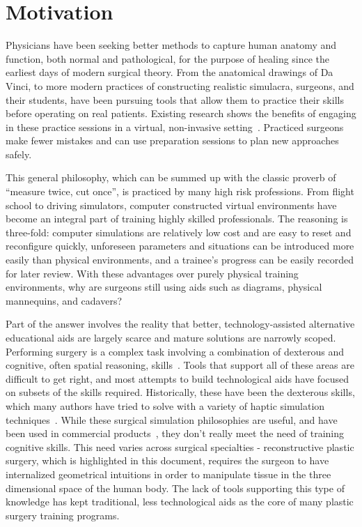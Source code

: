 \section{Motivation}

Physicians have been seeking better methods to capture human anatomy
and function, both normal and pathological, for the purpose of healing
since the earliest days of modern surgical theory. From the anatomical
drawings of Da Vinci, to more modern practices of constructing
realistic simulacra, surgeons, and their students, have been pursuing
tools that allow them to practice their skills before operating on
real patients. Existing research shows the benefits of engaging in
these practice sessions in a virtual, non-invasive
setting~\citep{GallaRCHFMSS:2005}. Practiced surgeons make fewer
mistakes and can use preparation sessions to plan new approaches
safely.

This general philosophy, which can be summed up with the classic
proverb of ``measure twice, cut once'', is practiced by many high risk
professions. From flight school to driving simulators, computer
constructed virtual environments have become an integral part of
training highly skilled professionals. The reasoning is three-fold:
computer simulations are relatively low cost and are easy to reset and
reconfigure quickly, unforeseen parameters and situations can be
introduced more easily than physical environments, and a trainee's
progress can be easily recorded for later review. With these
advantages over purely physical training environments, why are
surgeons still using aids such as diagrams, physical mannequins, and
cadavers?

Part of the answer involves the reality that better,
technology-assisted alternative educational aids are largely scarce
and mature solutions are narrowly scoped.  Performing surgery is a
complex task involving a combination of dexterous and cognitive, often
spatial reasoning, skills~\citep{GallaRCHFMSS:2005}. Tools that
support all of these areas are difficult to get right, and most
attempts to build technological aids have focused on subsets of the
skills required. Historically, these have been the dexterous skills,
which many authors have tried to solve with a variety of haptic
simulation techniques~\citep{MendoL:2003, LindbT:2007}. While these
surgical simulation philosophies are useful, and have been used in
commercial products~\citep{SUSAC:2002--2014}, they don't really meet
the need of training cognitive skills. This need varies across
surgical specialties - reconstructive plastic surgery, which is
highlighted in this document, requires the surgeon to have
internalized geometrical intuitions in order to manipulate tissue in
the three dimensional space of the human body. The lack of tools
supporting this type of knowledge has kept traditional, less
technological aids as the core of many plastic surgery training
programs.

